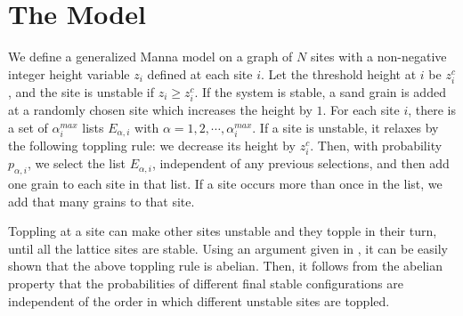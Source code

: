 \documentclass[11pt,a4paper]{book}
\begin{document}
\section{The Model}\label{sec:ch5.2}
 
 We define a generalized Manna model on a graph of $N$ sites with a 
non-negative integer height variable $z_i$ defined at each site $i$. Let 
the threshold height at $i$ be $z_i^c$, and the site is unstable if $z_i 
\geq z_i^c$.  If the system is stable, a sand grain is added at a 
randomly chosen site which increases the height by $1$.  For each site 
$i$, there is a set of $\alpha_i^{max}$ lists $E_{\alpha,i}$ with 
$\alpha=1,2,\cdots,\alpha_i^{max}$.  If a site is unstable, it relaxes 
by the following toppling rule: we decrease its height by $z_{i}^c$. 
Then, with probability $p_{\alpha,i}$, we select the list 
$E_{\alpha,i}$, independent of any previous selections, and then add one 
grain to each site in that list. If a site occurs more than once in the 
list, we add that many grains to that site.

 Toppling at a site can make other sites unstable and they topple in 
their turn, until all the lattice sites are stable. Using an argument
given in \cite{sasm}, it can be easily shown that the above toppling
rule is abelian. Then, it follows from the 
abelian property that the probabilities of different final 
stable configurations are independent of the order in which different 
unstable sites are toppled.
\end{document}
